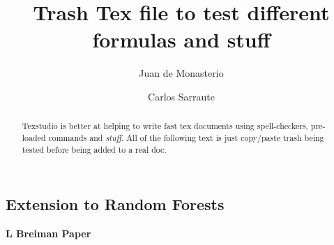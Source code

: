 \documentclass{article}%
\newcommand{\Expect}{{\mathbb{E}}}
\newtheorem{definition}{Definition}[subsection]
\theoremstyle{definition}
\begin{document}

\title{Trash Tex file to test different formulas and stuff}




\author{
	Juan de Monasterio
	\and Carlos Sarraute
}

%
%


\maketitle
\begin{abstract}
	
	Texstudio is better at helping to write fast tex documents using spell-checkers, pre-loaded commands and \textit{stuff}. All of the following text is just copy/paste trash being tested before being added to a real doc.
	



	
	
\end{abstract} 

\subsection{Extension to Random Forests}
\textbf{L Breiman Paper}\cite{breiman-randomforests}
\end{document}
